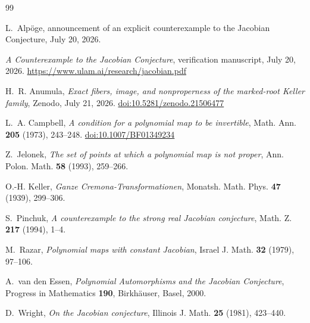 \documentclass[11pt,reqno]{amsart}
\numberwithin{equation}{section}
\theoremstyle{remark}
\begin{document}
\begin{thebibliography}{99}

L.~Alp\"oge, announcement of an explicit counterexample to the Jacobian
Conjecture, July 20, 2026.

\emph{A Counterexample to the Jacobian Conjecture}, verification
manuscript, July 20, 2026. \url{https://www.ulam.ai/research/jacobian.pdf}

H.~R. Anumula, \emph{Exact fibers, image, and nonproperness of the
marked-root Keller family}, Zenodo, July 21, 2026.
\href{https://doi.org/10.5281/zenodo.21506477}{doi:10.5281/zenodo.21506477}

L.~A. Campbell, \emph{A condition for a polynomial map to be invertible},
Math. Ann. \textbf{205} (1973), 243--248.
\href{https://doi.org/10.1007/BF01349234}{doi:10.1007/BF01349234}

Z.~Jelonek, \emph{The set of points at which a polynomial map is not
proper}, Ann. Polon. Math. \textbf{58} (1993), 259--266.

O.-H. Keller, \emph{Ganze Cremona-Transformationen}, Monatsh. Math. Phys.
\textbf{47} (1939), 299--306.

S.~Pinchuk, \emph{A counterexample to the strong real Jacobian conjecture},
Math. Z. \textbf{217} (1994), 1--4.

M.~Razar, \emph{Polynomial maps with constant Jacobian}, Israel J. Math.
\textbf{32} (1979), 97--106.

A.~van den Essen, \emph{Polynomial Automorphisms and the Jacobian
Conjecture}, Progress in Mathematics \textbf{190}, Birkh\"auser, Basel,
2000.

D.~Wright, \emph{On the Jacobian conjecture}, Illinois J. Math.
\textbf{25} (1981), 423--440.

\end{thebibliography}
\end{document}
